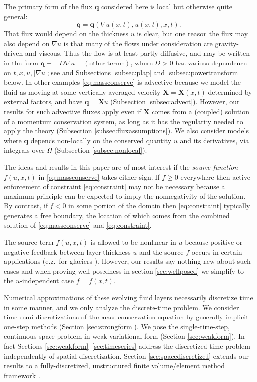 \documentclass[final,onefignum]{siamart190516}
\newcommand\bq{\mathbf{q}}
\newcommand\bX{\mathbf{X}}
\newcommand{\grad}{\nabla}
\begin{document}
The primary form of the flux $\bq$ considered here is local but otherwise quite general:
\begin{equation}
\bq = \bq(\grad u(x,t),u(x,t),x,t). \label{eq:fluxdepends}
\end{equation}
That flux would depend on the thickness $u$ is clear, but one reason the flux may also depend on $\grad u$ is that many of the flows under consideration are gravity-driven and viscous.  Thus the flow is at least partly diffusive, and may be written in the form $\bq=- D \grad u + (\text{other terms})$, where $D > 0$ has various dependence on $t,x,u,|\grad u|$; see \cite{Ockendonetal2003} and Subsections \ref{subsec:plap} and \ref{subsec:powertransform} below.  In other examples \eqref{eq:massconserve} is advective because we model the fluid as moving at some vertically-averaged velocity $\bX=\bX(x,t)$ determined by external factors, and have $\bq = \bX u$ (Subsection \ref{subsec:advect}).  However, our results for such advective fluxes apply even if $\bX$ comes from a (coupled) solution of a momentum conservation system, as long as it has the regularity needed to apply the theory (Subsection \ref{subsec:fluxassumptions}).  We also consider models where $\bq$ depends non-locally on the conserved quantity $u$ and its derivatives, via integrals over $\Omega$ (Subsection \ref{subsec:nonlocal}).

The ideas and results in this paper are of most interest if the \emph{source function} $f(u,x,t)$ in \eqref{eq:massconserve} takes either sign.  If $f\ge 0$ everywhere then active enforcement of constraint \eqref{eq:constraint} may not be necessary because a maximum principle can be expected to imply the nonnegativity of the solution.  By contrast, if $f<0$ in some portion of the domain then \eqref{eq:constraint} typically generates a free boundary, the location of which comes from the combined solution of \eqref{eq:massconserve} and \eqref{eq:constraint}.

The source term $f(u,x,t)$ is allowed to be nonlinear in $u$ because positive or negative feedback between layer thickness $u$ and the source $f$ occurs in certain applications (e.g.~for glaciers \cite{Jouvetetal2011}).  However, our results say nothing new about such cases and when proving well-posedness in section \ref{sec:wellposed} we simplify to the $u$-independent case $f=f(x,t)$.

Numerical approximations of these evolving fluid layers necessarily discretize time in some manner, and we only analyze the discrete-time problem.  We consider time semi-discretizations of the mass conservation equation by generally-implicit one-step methods (Section \ref{sec:strongform}).  We pose the single-time-step, continuous-space problem in weak variational form (Section \ref{sec:weakform}).  In fact Sections \ref{sec:weakform}--\ref{sec:timeseries} address the discretized-time problem independently of spatial discretization.  Section \ref{sec:spacediscretized} extends our results to a fully-discretized, unstructured finite volume/element method framework \cite{Cai1990}.
\end{document}
